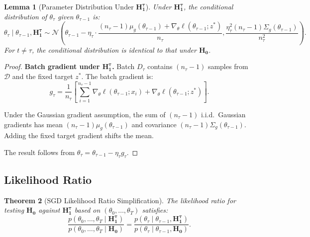 \documentclass{article}
\theoremstyle{plain}
\newtheorem{theorem}{Theorem}[section]
\newtheorem{lemma}[theorem]{Lemma}
\theoremstyle{definition}
\theoremstyle{remark}
\newcommand{\cN}{\ensuremath{\mathcal{N}}}
\newcommand{\cD}{\ensuremath{\mathcal{D}}}
\begin{document}
\begin{lemma}[Parameter Distribution Under $\mathbf{H_1^\tau}$]
    \label{lem:sgd-h1}
    Under $\mathbf{H_1^\tau}$, the conditional distribution of $\theta_\tau$ given $\theta_{\tau-1}$ is:
    \begin{equation*}
        \theta_\tau \mid \theta_{\tau-1}, \mathbf{H_1^\tau} \sim \cN\left(\theta_{\tau-1} - \eta_\tau \cdot \frac{(n_\tau-1)\mu_g(\theta_{\tau-1}) + \nabla_\theta \ell(\theta_{\tau-1}; z^*)}{n_\tau}, \frac{\eta_\tau^2(n_\tau-1)\Sigma_g(\theta_{\tau-1})}{n_\tau^2}\right).
    \end{equation*}
    For $t \neq \tau$, the conditional distribution is identical to that under $\mathbf{H_0}$.
\end{lemma}

\begin{proof}
    \textbf{Batch gradient under $\mathbf{H_1^\tau}$.}
    Batch $D_\tau$ contains $(n_\tau - 1)$ samples from $\cD$ and the fixed target $z^*$. The batch gradient is:
    \begin{equation*}
        g_\tau = \frac{1}{n_\tau}\left[\sum_{i=1}^{n_\tau-1} \nabla_\theta \ell(\theta_{\tau-1}; x_i) + \nabla_\theta \ell(\theta_{\tau-1}; z^*)\right].
    \end{equation*}

    Under the Gaussian gradient assumption, the sum of $(n_\tau - 1)$ i.i.d.\ Gaussian gradients has mean $(n_\tau-1)\mu_g(\theta_{\tau-1})$ and covariance $(n_\tau-1)\Sigma_g(\theta_{\tau-1})$. Adding the fixed target gradient shifts the mean.

    The result follows from $\theta_\tau = \theta_{\tau-1} - \eta_\tau g_\tau$.
\end{proof}

\subsection{Likelihood Ratio}

\begin{theorem}[SGD Likelihood Ratio Simplification]
    \label{thm:sgd-lr-simplification}
    The likelihood ratio for testing $\mathbf{H_0}$ against $\mathbf{H_1^\tau}$ based on $(\theta_0, \ldots, \theta_T)$ satisfies:
    \begin{equation*}
        \frac{p(\theta_0, \ldots, \theta_T \mid \mathbf{H_1^\tau})}{p(\theta_0, \ldots, \theta_T \mid \mathbf{H_0})} = \frac{p(\theta_\tau \mid \theta_{\tau-1}, \mathbf{H_1^\tau})}{p(\theta_\tau \mid \theta_{\tau-1}, \mathbf{H_0})}.
    \end{equation*}
\end{theorem}
\end{document}
